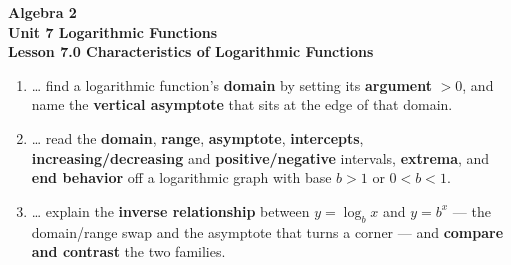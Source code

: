 \documentclass[10pt]{article}
\begin{document}
\vspace{-0.8in}

\begin{center}
  {\color{white}\textbf{\LARGE Algebra 2}}\\[4pt]
  {\color{forestmid}\large\textbf{Unit 7 \quad Logarithmic Functions}}\\[6pt]
  {\color{white}\textbf{\large Lesson 7.0 \quad Characteristics of Logarithmic Functions}}
\end{center}

\vspace{0.22in}
\namedateperiod
\vspace{0.18in}

\begin{learningtargetbox}
\small
\begin{enumerate}[leftmargin=1.5em, itemsep=5pt]
  \item \ldots{} find a logarithmic function's \textbf{domain} by setting its \textbf{argument} $>0$, and name the \textbf{vertical asymptote} that sits at the edge of that domain.
  \item \ldots{} read the \textbf{domain}, \textbf{range}, \textbf{asymptote}, \textbf{intercepts}, \textbf{increasing/decreasing} and \textbf{positive/negative} intervals, \textbf{extrema}, and \textbf{end behavior} off a logarithmic graph with base $b>1$ or $0<b<1$.
  \item \ldots{} explain the \textbf{inverse relationship} between $y=\log_b x$ and $y=b^x$ --- the domain/range swap and the asymptote that turns a corner --- and \textbf{compare and contrast} the two families.
\end{enumerate}
\end{learningtargetbox}

\vspace{0.14in}
\end{document}
